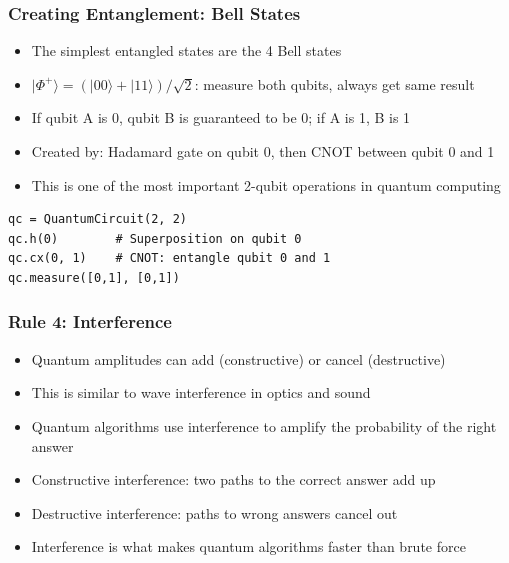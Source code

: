 \begin{frame}[fragile]\frametitle{Creating Entanglement: Bell States}
\begin{itemize}
\item The simplest entangled states are the 4 Bell states
\item $|\Phi^+\rangle = (|00\rangle + |11\rangle)/\sqrt{2}$: measure both qubits, always get same result
\item If qubit A is 0, qubit B is guaranteed to be 0; if A is 1, B is 1
\item Created by: Hadamard gate on qubit 0, then CNOT between qubit 0 and 1
\item This is one of the most important 2-qubit operations in quantum computing
\end{itemize}
\begin{verbatim}
qc = QuantumCircuit(2, 2)
qc.h(0)        # Superposition on qubit 0
qc.cx(0, 1)    # CNOT: entangle qubit 0 and 1
qc.measure([0,1], [0,1])
\end{verbatim}
\end{frame}

\begin{frame}[fragile]\frametitle{Rule 4: Interference}
\begin{itemize}
\item Quantum amplitudes can add (constructive) or cancel (destructive)
\item This is similar to wave interference in optics and sound
\item Quantum algorithms use interference to amplify the probability of the right answer
\item Constructive interference: two paths to the correct answer add up
\item Destructive interference: paths to wrong answers cancel out
\item Interference is what makes quantum algorithms faster than brute force
\end{itemize}
\end{frame}

